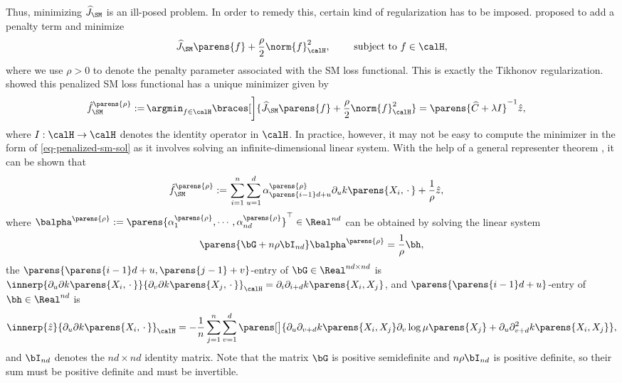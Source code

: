 \documentclass[12pt]{article}
\theoremstyle{definition}
\theoremstyle{theorem}
\theoremstyle{remark}
\begin{document}
Thus, minimizing $\widehat{J}_{\SM}$ is an ill-posed problem. In order to remedy this, certain kind of regularization has to be imposed. %
\textcite{Sriperumbudur-density-estimation-inf-exp-family} proposed to add a penalty term and minimize 
\begin{align}
	\widehat{J}_{\SM} \parens{f} + \frac{\rho}{2} \norm{f}_{\calH}^2, \qquad \text{ subject to } f \in \calH, 
\end{align}
where we use $\rho > 0$ to denote the penalty parameter associated with the SM loss functional. 
This is exactly the Tikhonov regularization. \textcite{Sriperumbudur-density-estimation-inf-exp-family} showed this penalized SM loss functional has a unique minimizer given by 
\begin{align}\label{eq-penalized-sm-sol}
	\hat{f}_{\SM}^{\parens{\rho}} := & \, \argmin_{f \in \calH} \braces[\bigg]{\widehat{J}_{\SM} \parens{f} + \frac{\rho}{2} \norm{f}_{\calH}^2} = \parens{\widehat{C} + \lambda I}^{-1} \hat{z}, 
\end{align}
where $I: \calH \to \calH$ denotes the identity operator in $\calH$. In practice, however, it may not be easy to compute the minimizer in the form of \eqref{eq-penalized-sm-sol} as it involves solving an infinite-dimensional linear system. With the help of a general representer theorem \parencites[Theorem A.2 in][]{Sriperumbudur-density-estimation-inf-exp-family}, it can be shown that 
\begin{align}
	\hat{f}_{\SM}^{\parens{\rho}} := & \, \sum_{i=1}^n \sum_{u=1}^d \alpha_{\parens{i-1}d+u}^{\parens{\rho}} \partial_u k \parens{X_i, \,\cdot\,} + \frac{1}{\rho} \hat{z}, 
\end{align}
where $\balpha^{\parens{\rho}} := \parens{\alpha_{1}^{\parens{\rho}}, \cdots, \alpha_{nd}^{\parens{\rho}}}^\top \in \Real^{nd}$ can be obtained by solving the linear system
\begin{align*}
	\parens{\bG + n \rho \bI_{nd}} \balpha^{\parens{\rho}} = \frac{1}{\rho} \bh, 
\end{align*}
the $\parens{\parens{i-1}d+u, \parens{j-1}+v}$-entry of $\bG \in \Real^{nd \times nd}$ is $\innerp{\partial_u \partial k \parens{X_i, \,\cdot\,}}{\partial_v \partial k \parens{X_j, \,\cdot\,}}_{\calH} = \partial_i \partial_{i+d} k \parens{X_i, X_j}$, and $\parens{\parens{i-1}d+u}$-entry of $\bh \in \Real^{nd}$ is 
\begin{align*}
	\innerp{\hat{z}}{\partial_u \partial k \parens{X_i, \,\cdot\,}}_{\calH} = - \frac{1}{n} \sum_{j=1}^n \sum_{v=1}^d \parens[\big]{\partial_u \partial_{v+d} k \parens{X_i, X_j} \partial_v \log \mu \parens{X_j} + \partial_u \partial^2_{v+d} k \parens{X_i, X_j} }, 
\end{align*}
and $\bI_{nd}$ denotes the $nd \times nd$ identity matrix. 
Note that the matrix $\bG$ is positive semidefinite and $n \rho \bI_{nd}$ is positive definite, so their sum must be positive definite and must be invertible. 
\end{document}
